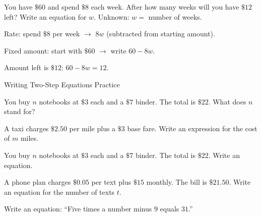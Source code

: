 \begin{stepExample}{You have $\$60$ and spend $\$8$ each week. After how many weeks will you have $\$12$ left? Write an equation for $w$.}
     Unknown: $w =$ number of weeks.

     Rate: spend $\$8$ per week $\to$ $8w$ (subtracted from starting amount).

     Fixed amount: start with $\$60$ $\to$ write $60 - 8w$.

     Amount left is $\$12$: $60 - 8w = 12$.
\end{stepExample}


\newpage
\begin{stepPractice}{Writing Two-Step Equations Practice}
    \resetProblems

    \prob You buy $n$ notebooks at $\$3$ each and a $\$7$ binder. The total is $\$22$. What does $n$ stand for? \answerBlank[3cm]

    \prob A taxi charges $\$2.50$ per mile plus a $\$3$ base fare. Write an expression for the cost of $m$ miles. \answerBlank[3cm]

    \prob You buy $n$ notebooks at $\$3$ each and a $\$7$ binder. The total is $\$22$. Write an equation. \answerBlank[3cm]

    \prob A phone plan charges $\$0.05$ per text plus $\$15$ monthly. The bill is $\$21.50$. Write an equation for the number of texts $t$. \answerBlank[3cm]

    \prob Write an equation: ``Five times a number minus $9$ equals $31$.'' \answerBlank[3cm]

\end{stepPractice}

